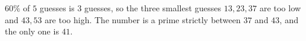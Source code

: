 $60\%$ of $5$ guesses is $3$ guesses, so the three smallest guesses $13,23,37$ are too low and $43,53$ are too high. The number is a prime strictly between $37$ and $43$, and the only one is $\boxed{41}$.
